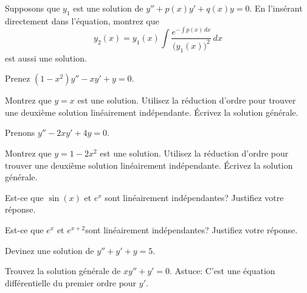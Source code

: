 \begin{exercise} \label{exercise:reductionoforder}
	Supposons que $y_1$ est une solution de $y'' + p(x) y' + q(x) y = 0$.
	En l'insérant directement dans l'équation, montrez que 
	\begin{equation*}
		y_2(x) = y_1(x) \int \frac{e^{-\int p(x)\,dx}}{{\bigl(y_1(x)\bigr)}^2} \,dx
	\end{equation*}
	est aussi une solution.
\end{exercise}

\begin{exercise}
	Prenez	$(1-x^2)y''-xy' + y = 0$.
	\begin{tasks}
		\task Montrez que $y=x$ est une solution.
		\task Utilisez la réduction d'ordre pour trouver une deuxième solution linéairement indépendante.
		\task Écrivez la solution générale. 
	\end{tasks}
\end{exercise}

\begin{exercise}
	Prenons	$y''-2xy' + 4y = 0$.
	\begin{tasks}
		\task Montrez que  $y=1-2x^2$ est une solution.
		\task Utilisez la réduction d'ordre pour trouver une deuxième solution linéairement indépendante.
		\task Écrivez la solution générale.
	\end{tasks}
\end{exercise}

\setcounter{exercise}{100}

\begin{exercise}
Est-ce que $\sin(x)$ et $e^x$ sont linéairement indépendantes?  Justifiez votre réponse.
\end{exercise}

\begin{exercise}
	Est-ce que  $e^x$ et $e^{x+2}$sont linéairement indépendantes?  Justifiez votre réponse.
\end{exercise}

\begin{exercise}
	Devinez une solution de $y'' + y' + y= 5$.
\end{exercise}

\begin{exercise}
	Trouvez la solution générale de
	$x y'' + y' = 0$.  Astuce: C'est une équation différentielle du premier ordre pour $y'$.
\end{exercise}

